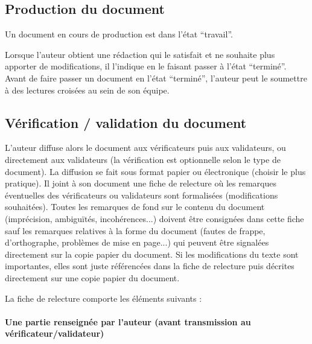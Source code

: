 
\subsection{Production du document}

Un document en cours de production est dans l'état ``travail''.

Lorsque l'auteur obtient une rédaction qui le satisfait et ne souhaite plus apporter de modifications, il l'indique en le faisant passer à l'état ``terminé''.
Avant de faire passer un document en l'état ``terminé'', l'auteur peut le soumettre à des lectures croisées au sein de son équipe.

\subsection{Vérification / validation du document}

L'auteur diffuse alors le document aux vérificateurs puis aux validateurs, ou directement aux validateurs (la vérification est optionnelle selon le type de document). La diffusion se fait sous format papier ou électronique (choisir le plus pratique).
Il joint à son document une fiche de relecture où les remarques éventuelles des vérificateurs ou validateurs sont formalisées (modifications souhaitées).
Toutes les remarques de fond sur le contenu du document (imprécision, ambiguïtés, incohérences...) doivent être consignées dans cette fiche sauf les remarques relatives à la forme du document (fautes de frappe, d'orthographe, problèmes de mise en page...) qui peuvent être signalées directement sur la copie papier du document.
 Si les modifications du texte sont importantes, elles sont juste référencées dans la fiche de relecture puis décrites directement sur une copie papier du document.


La fiche de relecture comporte les éléments suivants : 

\paragraph{Une partie renseignée par l'auteur (avant transmission au vérificateur/validateur)}

